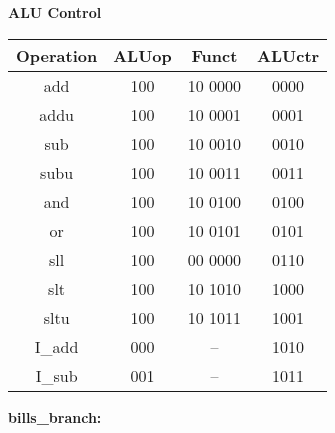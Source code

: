\documentclass[11pt]{article}   	%
\begin{document}
\newpage

\Large
\textbf{ALU Control}\\
\normalsize

\begin{table}[!htbp]
\centering
\begin{tabular}{|c|c|c|c|}
\hline
\bf Operation & \bf ALUop & \bf Funct & \bf ALUctr\\
\hline
add & 100 & 10 0000 & 0000\\
\hline
addu & 100 & 10 0001 & 0001 \\
\hline
sub & 100 & 10 0010 & 0010 \\
\hline
subu & 100 & 10 0011 & 0011 \\
\hline
and & 100 & 10 0100 & 0100 \\
\hline
or & 100 & 10 0101 & 0101\\
\hline
sll & 100 & 00 0000 & 0110\\
\hline
slt & 100 & 10 1010 & 1000\\
\hline
sltu & 100 & 10 1011 & 1001\\
\hline
I\_add & 000 & -- & 1010 \\
\hline
I\_sub & 001 & -- & 1011\\
\hline

\end{tabular}
\end{table}


\newpage

\textbf{bills\_branch:}\\
\end{document}

